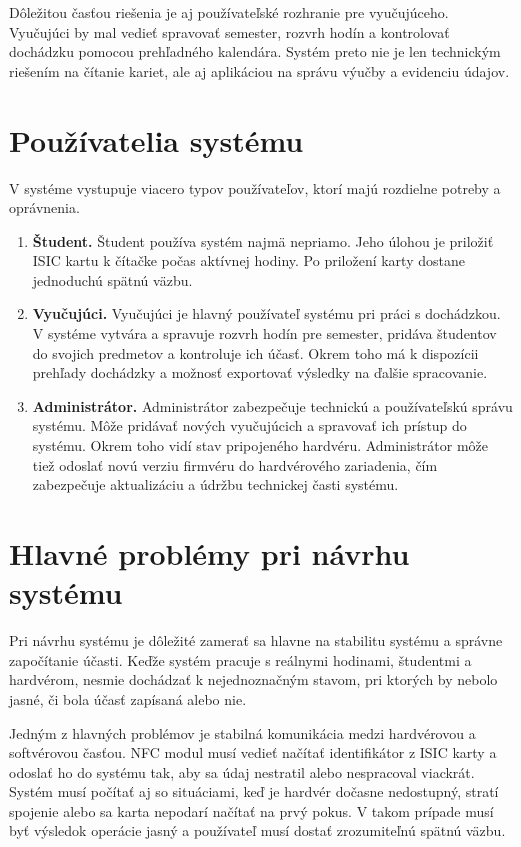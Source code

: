 Dôležitou časťou riešenia je aj používateľské rozhranie pre vyučujúceho. Vyučujúci by mal vedieť spravovať semester, rozvrh hodín a kontrolovať dochádzku pomocou prehľadného kalendára. Systém preto nie je len technickým riešením na čítanie kariet, ale aj aplikáciou na správu výučby a evidenciu údajov.

\section{Používatelia systému}
\label{sec:system-users}

V systéme vystupuje viacero typov používateľov, ktorí majú rozdielne potreby a oprávnenia.

\begin{enumerate}
    \item \textbf{Študent.}  
    Študent používa systém najmä nepriamo. Jeho úlohou je priložiť ISIC kartu k čítačke počas aktívnej hodiny. Po priložení karty dostane jednoduchú spätnú väzbu.

     \item \textbf{Vyučujúci.}  
    Vyučujúci je hlavný používateľ systému pri práci s dochádzkou. V systéme vytvára a spravuje rozvrh hodín pre semester, pridáva študentov do svojich predmetov a kontroluje ich účasť. Okrem toho má k dispozícii prehľady dochádzky a možnosť exportovať výsledky na ďalšie spracovanie.

    \item \textbf{Administrátor.}  
    Administrátor zabezpečuje technickú a používateľskú správu systému. Môže pridávať nových vyučujúcich a spravovať ich prístup do systému. Okrem toho vidí stav pripojeného hardvéru. Administrátor môže tiež odoslať novú verziu firmvéru do hardvérového zariadenia, čím zabezpečuje aktualizáciu a údržbu technickej časti systému.
\end{enumerate}

\section{Hlavné problémy pri návrhu systému}
\label{sec:main-design-problems}

Pri návrhu systému je dôležité zamerať sa hlavne na stabilitu systému a správne započítanie účasti. Keďže systém pracuje s reálnymi hodinami, študentmi a hardvérom, nesmie dochádzať k nejednoznačným stavom, pri ktorých by nebolo jasné, či bola účasť zapísaná alebo nie.

Jedným z hlavných problémov je stabilná komunikácia medzi hardvérovou a softvérovou časťou. NFC modul musí vedieť načítať identifikátor z ISIC karty a odoslať ho do systému tak, aby sa údaj nestratil alebo nespracoval viackrát. Systém musí počítať aj so situáciami, keď je hardvér dočasne nedostupný, stratí spojenie alebo sa karta nepodarí načítať na prvý pokus. V takom prípade musí byť výsledok operácie jasný a používateľ musí dostať zrozumiteľnú spätnú väzbu.

